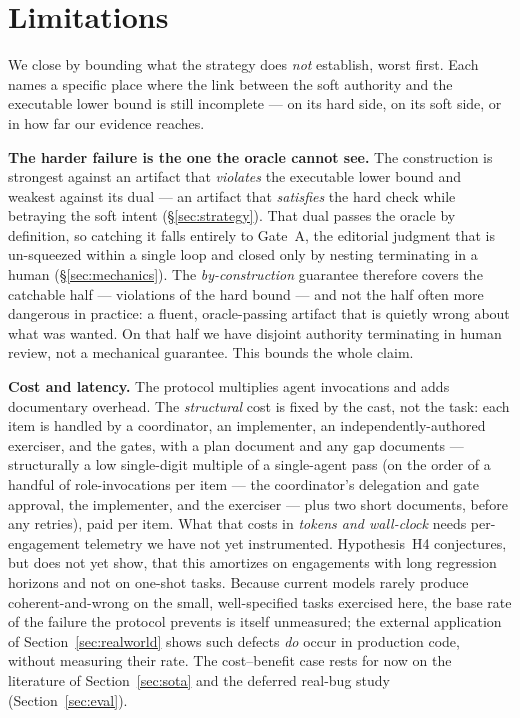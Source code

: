 \documentclass[11pt]{article}
\begin{document}
\section{Limitations}
\label{sec:limitations}

We close by bounding what the strategy does \emph{not} establish, worst first. Each names a specific
place where the link between the soft authority and the
executable lower bound is still incomplete --- on its hard side, on its soft side, or in how far
our evidence reaches.

\textbf{The harder failure is the one the oracle cannot see.} The construction is strongest against
an artifact that \emph{violates} the executable lower bound and weakest against its dual --- an
artifact that \emph{satisfies} the hard check while betraying the soft intent (\S\ref{sec:strategy}).
That dual passes the oracle by definition, so catching it falls entirely to Gate~A, the editorial
judgment that is un-squeezed within a single loop and closed only by nesting terminating in a human
(\S\ref{sec:mechanics}). The \emph{by-construction} guarantee therefore covers the catchable half
--- violations of the hard bound --- and not the half often more dangerous in practice: a fluent,
oracle-passing artifact that is quietly wrong about what was wanted. On that half we have disjoint
authority terminating in human review, not a mechanical guarantee. This bounds the whole claim.

\textbf{Cost and latency.} The protocol multiplies agent invocations and adds documentary
overhead. The \emph{structural} cost is fixed by the cast, not the task: each item is handled by
a coordinator, an implementer, an independently-authored exerciser, and the gates, with a plan
document and any gap documents --- structurally a low single-digit multiple of a single-agent pass
(on the order of a handful of role-invocations per item --- the coordinator's delegation and gate
approval, the implementer, and the exerciser --- plus two short documents, before any retries), paid
per item. What that costs in \emph{tokens and wall-clock} needs per-engagement telemetry we have not
yet instrumented. Hypothesis~H4 conjectures, but does not yet show, that this amortizes on
engagements with long regression horizons and not on one-shot tasks. Because current models
rarely produce coherent-and-wrong on the small, well-specified tasks exercised here, the base
rate of the failure the protocol prevents is itself unmeasured; the external application of
Section~\ref{sec:realworld} shows such defects \emph{do} occur in production code, without
measuring their rate. The cost--benefit case rests for now on the literature of
Section~\ref{sec:sota} and the deferred real-bug study (Section~\ref{sec:eval}).
\end{document}
